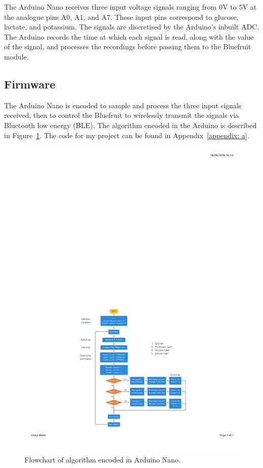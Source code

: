 The Arduino Nano receives three input voltage signals ranging from 0V to 5V at the analogue pins A0, A1, and A7. These input pins correspond to glucose, lactate, and potassium. The signals are discretised by the Arduino's inbuilt ADC. The Arduino records the time at which each signal is read, along with the value of the signal, and processes the recordings before passing them to the Bluefruit module.




\subsection{Firmware}
The Arduino Nano is encoded to sample and process the three input signals received, then to control the Bluefruit to wirelessly transmit the signals via Bluetooth low energy (BLE). The algorithm encoded in the Arduino is described in Figure~\ref{fig: psuedocode}. The code for my project can be found in Appendix~\ref{appendix: a}.

\begin{figure}[t!]
\centering
\includegraphics[trim={0cm 0cm 0cm  0cm}, clip, width=1\textwidth]{./figures/psuedocode.pdf}
\captionsetup{justification=centering}
\caption{Flowchart of algorithm encoded in Arduino Nano.}
\label{fig: psuedocode}
\end{figure}



